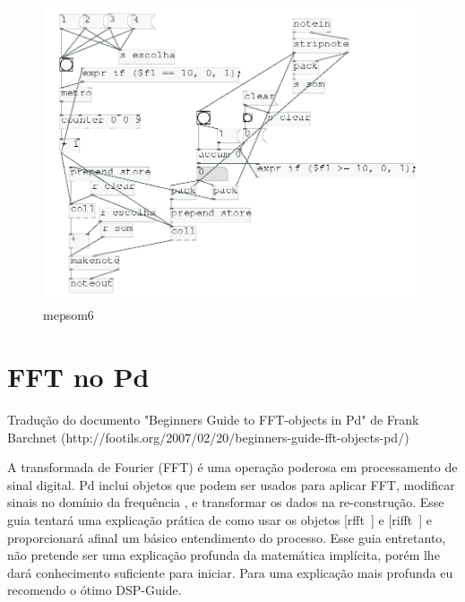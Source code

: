 \documentclass{ppgmus}
\begin{document}
\begin{figure}[-h]
\includegraphics[scale=.4]{mepsom6}
\caption{mepsom6}
\label{mepsom6}
\end{figure}



\section{FFT no Pd}
\label{sec:fftpd}

Tradução do documento "Beginners Guide to FFT-objects in Pd" de Frank Barchnet 
(http://footils.org/2007/02/20/beginners-guide-fft-objects-pd/)

A transformada de Fourier (FFT) é uma operação poderosa em processamento de sinal digital.
Pd inclui objetos que podem ser usados para aplicar FFT, modificar sinais no domínio da frequência , 
e transformar os dados na re-construção. Esse guia tentará uma explicação prática de como usar os 
objetos [rfft~] e [rifft~] e proporcionará afinal um básico entendimento do processo.
Esse guia entretanto, não pretende ser uma explicação profunda da matemática implícita, porém lhe 
dará conhecimento suficiente para iniciar. Para uma explicação mais profunda eu recomendo o ótimo  
DSP-Guide.
\end{document}
